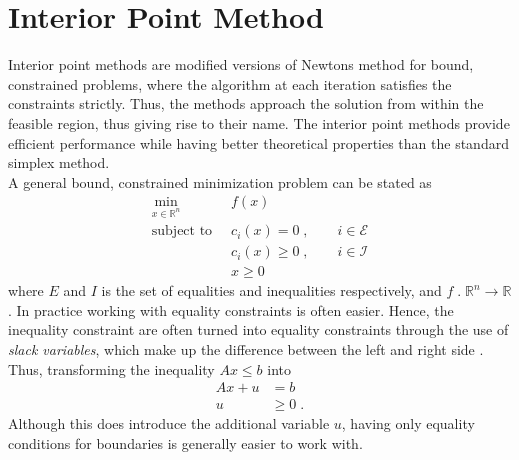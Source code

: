 \chapter{Interior Point Method}
Interior point methods are modified versions of Newtons method for bound, constrained problems, where the algorithm at each iteration satisfies the constraints strictly. Thus, the methods approach the solution from within the feasible region, thus giving rise to their name. The interior point methods provide efficient performance while having better theoretical properties than the standard simplex method.\\

A general bound, constrained minimization problem can be stated as
\begin{align*}
	\min_{x \in \mathbb{R}^n} \;  & \; f(x) \\
	\text{subject to} \;  & \; c_i(x) = 0 \; , \qquad i \in \mathcal{E} \\
							& \; c_i(x) \geq 0  \; , \qquad  i \in \mathcal{I} \\
							& \; x \geq 0
\end{align*}
where $E$ and $I$ is the set of equalities and inequalities respectively, and $f \; . \; \mathbb{R}^n \to \mathbb{R}$.
In practice working with equality constraints is often easier. Hence, the inequality constraint are often turned into equality constraints through the use of \textit{slack variables}, which make up the difference between the left and right side \cite{ipopt}. Thus, transforming the inequality $A x \leq b$ into
\begin{align*}
	A x + u &= b \\
	u & \geq 0 \; .
\end{align*}
Although this does introduce the additional variable $u$, having only equality conditions for boundaries is generally easier to work with.

